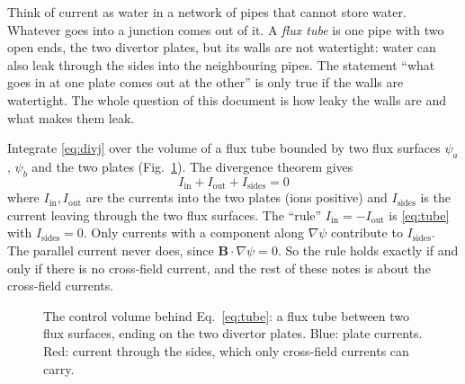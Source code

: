 \documentclass[11pt,a4paper]{article}
\newcommand{\bB}{\mathbf{B}}
\begin{document}
\begin{tcolorbox}[eli={ELI5: water in pipes}]
Think of current as water in a network of pipes that cannot store water. Whatever goes into a junction comes out of it.
A \emph{flux tube} is one pipe with two open ends, the two divertor plates, but its walls are not watertight: water
can also leak through the sides into the neighbouring pipes. The statement ``what goes in at one plate comes out at the
other'' is only true if the walls are watertight. The whole question of this document is how leaky the walls are and
what makes them leak.
\end{tcolorbox}

Integrate \eqref{eq:divj} over the volume of a flux tube bounded by two flux surfaces $\psi_a$, $\psi_b$ and the two
plates (Fig.~\ref{fig:tube}). The divergence theorem gives
\begin{equation}
  \boxed{\;I_{\mathrm{in}} + I_{\mathrm{out}} + I_{\mathrm{sides}} = 0\;}
  \label{eq:tube}
\end{equation}
where $I_{\mathrm{in}}, I_{\mathrm{out}}$ are the currents into the two plates (ions positive) and $I_{\mathrm{sides}}$
is the current leaving through the two flux surfaces. The ``rule'' $I_{\mathrm{in}} = -I_{\mathrm{out}}$ is
\eqref{eq:tube} with $I_{\mathrm{sides}} = 0$. Only currents with a component along $\nabla\psi$ contribute to
$I_{\mathrm{sides}}$. The parallel current never does, since $\bB\cdot\nabla\psi = 0$. So the rule holds exactly if and
only if there is no cross-field current, and the rest of these notes is about the cross-field currents.

\begin{figure}[h]
\centering
{}
\caption{The control volume behind Eq.~\eqref{eq:tube}: a flux tube between two flux surfaces, ending on the two
divertor plates. Blue: plate currents. Red: current through the sides, which only cross-field currents can carry.}
\label{fig:tube}
\end{figure}
\end{document}
